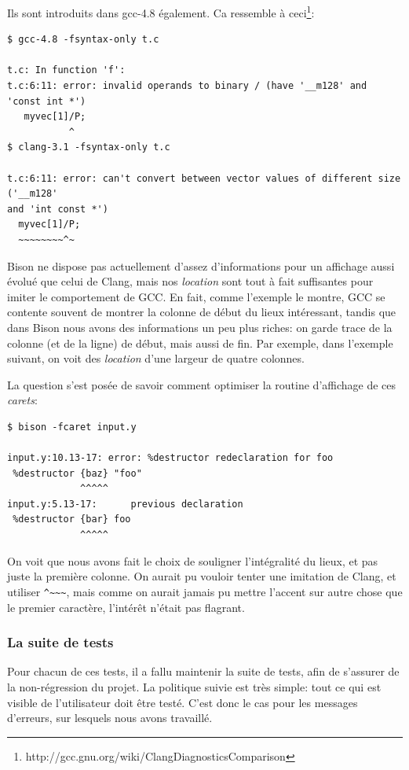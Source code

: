 \documentclass[a4paper,11pt,twoside,final]{article}
\begin{document}
  Ils sont introduits dans gcc-4.8 également. Ca ressemble à ceci\footnote{%
  http://gcc.gnu.org/wiki/ClangDiagnosticsComparison}:

  \begin{verbatim}
$ gcc-4.8 -fsyntax-only t.c

t.c: In function 'f':
t.c:6:11: error: invalid operands to binary / (have '__m128' and 'const int *')
   myvec[1]/P;
           ^
$ clang-3.1 -fsyntax-only t.c

t.c:6:11: error: can't convert between vector values of different size ('__m128'
and 'int const *')
  myvec[1]/P;
  ~~~~~~~~^~
  \end{verbatim}

  Bison ne dispose pas actuellement d'assez d'informations pour un affichage
  aussi évolué que celui de Clang, mais nos \textit{location} sont tout à fait
  suffisantes pour imiter le comportement de GCC\@. En fait, comme l'exemple le
  montre, GCC se contente souvent de montrer la colonne de début du lieux
  intéressant, tandis que dans Bison nous avons des informations un peu plus
  riches: on garde trace de la colonne (et de la ligne) de début, mais aussi de
  fin. Par exemple, dans l'exemple suivant, on voit des \textit{location} d'une
  largeur de quatre colonnes.

  La question s'est posée de savoir comment optimiser la routine d'affichage de
  ces \textit{carets}:
  \begin{verbatim}
$ bison -fcaret input.y

input.y:10.13-17: error: %destructor redeclaration for foo
 %destructor {baz} "foo"
             ^^^^^
input.y:5.13-17:      previous declaration
 %destructor {bar} foo
             ^^^^^
\end{verbatim}

  On voit que nous avons fait le choix de souligner l'intégralité du lieux, et
  pas juste la première colonne. On aurait pu vouloir tenter une imitation de
  Clang, et utiliser \verb|^~~~|, mais comme on aurait jamais pu
  mettre l'accent sur autre chose que le premier caractère, l'intérêt n'était
  pas flagrant.


  \subsubsection{La suite de tests}

  Pour chacun de ces tests, il a fallu maintenir la suite de tests, afin de
  s'assurer de la non-régression du projet. La politique suivie est très
  simple: tout ce qui est visible de l'utilisateur doit être testé. C'est donc
  le cas pour les messages d'erreurs, sur lesquels nous avons travaillé.
\end{document}
